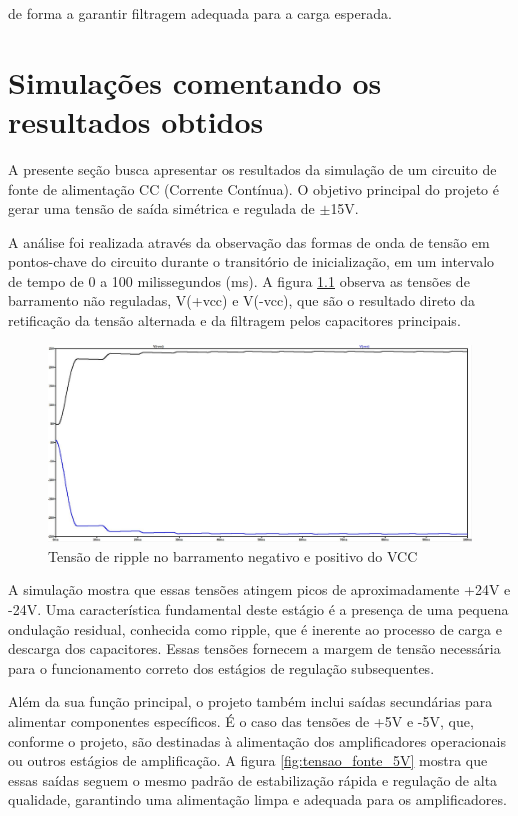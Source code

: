 \documentclass[
	12pt,				%
	oneside,			%
	a4paper,			%
	chapter=TITLE,
	sumario=tradicional,
	english,			%
	brazil				%
]{abntex2}
\begin{document}
de forma a garantir filtragem adequada para a carga esperada.

\chapter{Simulações comentando os resultados obtidos}\label{cap:simulacao}

A presente seção busca apresentar os resultados da simulação de um circuito de fonte de alimentação CC (Corrente Contínua). O objetivo principal do projeto é gerar uma tensão de saída simétrica e regulada de $\pm$15V.

A análise foi realizada através da observação das formas de onda de tensão em pontos-chave do circuito durante o transitório de inicialização, em um intervalo de tempo de 0 a 100 milissegundos (ms).
 A figura \ref{fig:tensao_vcc_riple} observa as tensões de barramento não reguladas, V(+vcc) e V(-vcc), que são o resultado direto da retificação da tensão alternada e da filtragem pelos capacitores principais.
 
\begin{figure}[H]
    \centering
    \includegraphics[width=0.9\linewidth]{images/simulacao/tensao_vcc_riple.jpg}
    \caption{Tensão de ripple no barramento negativo e positivo do VCC}
    \label{fig:tensao_vcc_riple}
\end{figure}

 A simulação mostra que essas tensões atingem picos de aproximadamente +24V e -24V. Uma característica fundamental deste estágio é a presença de uma pequena ondulação residual, conhecida como ripple, que é inerente ao processo de carga e descarga dos capacitores. Essas tensões fornecem a margem de tensão necessária para o funcionamento correto dos estágios de regulação subsequentes.

Além da sua função principal, o projeto também inclui saídas secundárias para alimentar componentes específicos. É o caso das tensões de +5V e -5V, que, conforme o projeto, são destinadas à alimentação dos amplificadores operacionais ou outros estágios de amplificação. A figura \ref{fig:tensao_fonte_5V} mostra que essas saídas seguem o mesmo padrão de estabilização rápida e regulação de alta qualidade, garantindo uma alimentação limpa e adequada para os amplificadores. 
\end{document}

